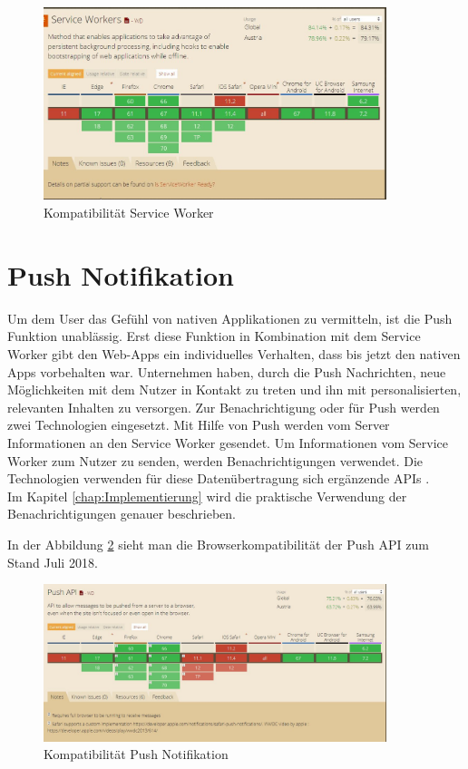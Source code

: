 \begin{figure}[h]
	\centering
	\includegraphics[width=10cm]{BilderAllgemein/BrowserSW}\medskip
	\caption{Kompatibilität Service Worker \cite{BrowserSupport}}
	\label{fig:BrowserSW}
\end{figure}


\section{Push Notifikation}
Um dem User das Gefühl von nativen Applikationen zu vermitteln, ist die Push Funktion unablässig. Erst diese Funktion in Kombination mit dem Service Worker gibt den \acl{Web-App}s ein individuelles Verhalten, dass bis jetzt den nativen Apps vorbehalten war.
Unternehmen haben, durch die Push Nachrichten, neue Möglichkeiten mit dem Nutzer in Kontakt zu treten und ihn mit personalisierten, relevanten Inhalten zu versorgen.
Zur Benachrichtigung oder für Push werden zwei Technologien eingesetzt. Mit Hilfe von Push werden vom Server Informationen an den Service Worker gesendet. Um Informationen vom Service Worker zum Nutzer zu senden, werden Benachrichtigungen verwendet. Die Technologien verwenden für diese Datenübertragung sich ergänzende APIs \cite{PushNotifikation}. \\
Im Kapitel \ref{chap:Implementierung} wird die praktische Verwendung der Benachrichtigungen genauer beschrieben.  
 

In der Abbildung \ref{fig:BrowserPushAPI} sieht man die Browserkompatibilität der Push API zum Stand Juli 2018.
\begin{figure}[H]
	\centering
	\includegraphics[width=10cm]{BilderAllgemein/BrowserPushAPI}\medskip
	\caption{Kompatibilität Push Notifikation \cite{BrowserSupport}}
	\label{fig:BrowserPushAPI}
\end{figure}



